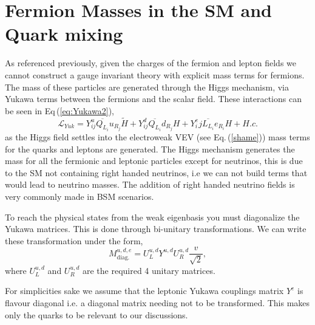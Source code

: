 \renewcommand{\cleardoublepage}{}
\renewcommand{\clearpage}{}

\section{Fermion Masses in the SM and Quark mixing}
\label{Chap_1_Sec_3}

As referenced previously, given the charges of the fermion and lepton fields we cannot construct a gauge invariant theory with explicit mass terms for fermions. 
%
The mass of these particles are generated through the Higgs mechanism, via Yukawa terms between the fermions and the scalar field. 
%
These interactions can be seen in Eq\,(\ref{eq:Yukawa2}), 
%
\begin{equation} 
\label{eq:Yukawa2}
\mathcal{L}_{Yuk} = Y^u_{ij} \overline{Q_{L_i}} u_{R_j}  \tilde{H} + Y^d_{ij} \overline{Q_{L_i}}  d_{R_j} H  + Y^e_ij \overline{L_{L_i}}  e_{R_i} H + H.c. 
\end{equation} 
%
as the Higgs field settles into the electroweak VEV (see Eq.\,(\ref{shame})) mass terms for the quarks and leptons are generated. 
%
The Higgs mechanism generates the mass for all the fermionic and leptonic particles except for neutrinos, this is due to the SM not containing right handed neutrinos, i.e we can not build terms that would lead to neutrino masses.
% 
The addition of right handed neutrino fields is very commonly made in BSM scenarios. 

To reach the physical states from the weak eigenbasis you must diagonalize the Yukawa matrices. This is done through bi-unitary transformations. 
% 
We can write these transformation under the form,
%
\begin{equation}
\label{YukawaMasses} 
M^{u,d,e}_{\text{diag.}}= U^{u,d}_L Y^{u,d} U^{u,d}_R \frac{v}{\sqrt{2}} , 
\end{equation} 
%
where $U^{u,d}_L$ and $U^{u,d}_R$ are the required 4 unitary matrices. 

%
%
For simplicities sake we assume that the leptonic Yukawa couplings matrix $Y^{e}$ is flavour diagonal i.e. a diagonal matrix needing not to be transformed. This makes only the quarks to be relevant to our discussions.  

